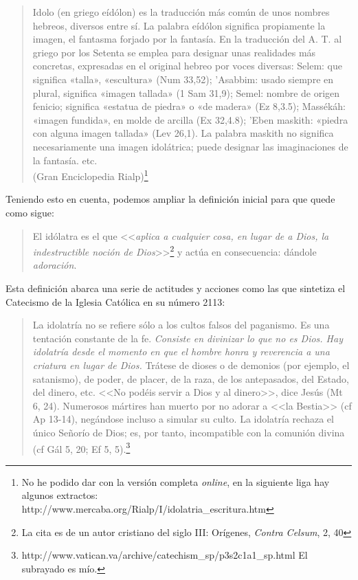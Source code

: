 \documentclass{article}
\begin{document}
\begin{quote}
Idolo (en griego eídólon) es la traducción más común de unos nombres hebreos, diversos entre sí. La palabra eídólon significa propiamente la imagen, el fantasma forjado por la fantasía. En la traducción del A. T. al griego por los Setenta se emplea para designar unas realidades más concretas, expresadas en el original hebreo por voces diversas: Selem: que significa «talla», «escultura» (Num 33,52); 'Asabbim: usado siempre en plural, significa «imagen tallada» (1 Sam 31,9); Semel: nombre de origen fenicio; significa «estatua de piedra» o «de madera» (Ez 8,3.5); Massékáh: «imagen fundida», en molde de arcilla (Ex 32,4.8); 'Eben maskith: «piedra con alguna imagen tallada» (Lev 26,1). La palabra maskith no significa necesariamente una imagen idolátrica; puede designar las imaginaciones de la fantasía. etc.\\
(Gran Enciclopedia Rialp)\footnote{No he podido dar con la versi\'on completa \emph{online}, en la siguiente liga hay algunos extractos: http://www.mercaba.org/Rialp/I/idolatria\_escritura.htm}
\end{quote}

\noindent
Teniendo esto en cuenta, podemos ampliar la definici\'on inicial para que quede como sigue:

\begin{quote}
El idólatra es el que <<\emph{aplica a cualquier cosa, en lugar de a Dios, la indestructible noción de Dios}>>\footnote{La cita es de un autor cristiano del siglo III: Orígenes, \emph{Contra Celsum}, 2, 40} y act\'ua en consecuencia: d\'andole \emph{adoraci\'on}.
\end{quote}

\noindent
Esta definici\'on abarca una serie de actitudes y acciones como las que sintetiza el Catecismo de la Iglesia Cat\'olica en su n\'umero 2113:

\begin{quote}
La idolatría no se refiere sólo a los cultos falsos del paganismo. Es una tentación constante de la fe. \emph{Consiste en divinizar lo que no es Dios. Hay idolatría desde el momento en que el hombre honra y reverencia a una criatura en lugar de Dios.} Trátese de dioses o de demonios (por ejemplo, el satanismo), de poder, de placer, de la raza, de los antepasados, del Estado, del dinero, etc. <<No podéis servir a Dios y al dinero>>, dice Jesús (Mt 6, 24). Numerosos mártires han muerto por no adorar a <<la Bestia>> (cf Ap 13-14), negándose incluso a simular su culto. La idolatría rechaza el único Señorío de Dios; es, por tanto, incompatible con la comunión divina (cf Gál 5, 20; Ef 5, 5).\footnote{http://www.vatican.va/archive/catechism\_sp/p3s2c1a1\_sp.html El subrayado es m\'{i}o.}
\end{quote}
\end{document}
